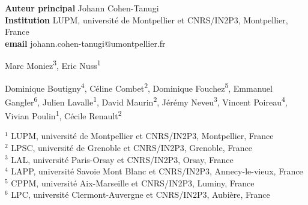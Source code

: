 
\def\altaffilmark#1{\textsuperscript{#1}}
\def\affil#1{\noindent #1 \\}

%

\begin{flushleft}
  {\bf Auteur principal}  Johann Cohen-Tanugi\\
  {\bf Institution}  LUPM, université de Montpellier et CNRS/IN2P3, Montpellier, France\\
  {\bf email} johann.cohen-tanugi@umontpellier.fr
\end{flushleft}       


\begin{raggedright}
\small
Marc Moniez\altaffilmark{3}, Eric Nuss\altaffilmark{1}
\end{raggedright}

\begin{raggedright}
\small
Dominique Boutigny\altaffilmark{4},
Céline Combet\altaffilmark{2},
Dominique Fouchez\altaffilmark{5},
Emmanuel Gangler\altaffilmark{6},
Julien Lavalle\altaffilmark{1},
David Maurin\altaffilmark{2},
Jérémy Neveu\altaffilmark{3},
Vincent Poireau\altaffilmark{4},
Vivian Poulin\altaffilmark{1},
Cécile Renault\altaffilmark{2}
\end{raggedright}

\scriptsize

\affil{$^{1}$ LUPM, université de Montpellier et CNRS/IN2P3, Montpellier, France}
\affil{$^{2}$ LPSC, université de Grenoble et CNRS/IN2P3, Grenoble, France}
\affil{$^{3}$ LAL, université Paris-Orsay et CNRS/IN2P3, Orsay, France}
\affil{$^{4}$ LAPP, université Savoie Mont Blanc et CNRS/IN2P3, Annecy-le-vieux, France}
\affil{$^{5}$ CPPM, université Aix-Marseille et CNRS/IN2P3, Luminy, France}
\affil{$^{6}$ LPC, université Clermont-Auvergne et CNRS/IN2P3, Aubière, France}
\normalsize
